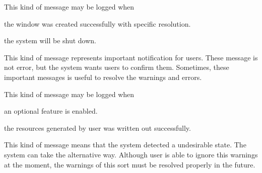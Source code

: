 \begin{Desc}
\begin{description}
This kind of message may be logged when
\begin{DoxyItemize}
\item the window was created successfully with specific resolution.
\item the system will be shut down. 
\end{DoxyItemize}\item[{\em 
\hypertarget{structhryky_1_1log_1_1level_1_1_kind_aa121006343f8971f566b5490b8001b21a0d27806ab638f3d364a201799beb0915}{notice\-\_\-}\label{structhryky_1_1log_1_1level_1_1_kind_aa121006343f8971f566b5490b8001b21a0d27806ab638f3d364a201799beb0915}
}]This kind of message represents important notification for users. These message is not error, but the system wants users to confirm them. Sometimes, these important messages is useful to resolve the warnings and errors.

This kind of message may be logged when
\begin{DoxyItemize}
\item an optional feature is enabled.
\item the resources generated by user was written out successfully. 
\end{DoxyItemize}\item[{\em 
\hypertarget{structhryky_1_1log_1_1level_1_1_kind_aa121006343f8971f566b5490b8001b21a93a6f12ecffb8aaca86c6a2c63db2001}{warning\-\_\-}\label{structhryky_1_1log_1_1level_1_1_kind_aa121006343f8971f566b5490b8001b21a93a6f12ecffb8aaca86c6a2c63db2001}
}]This kind of message means that the system detected a undesirable state. The system can take the alternative way. Although user is able to ignore this warnings at the moment, the warnings of this sort must be resolved properly in the future.


\end{description}
\end{Desc}
